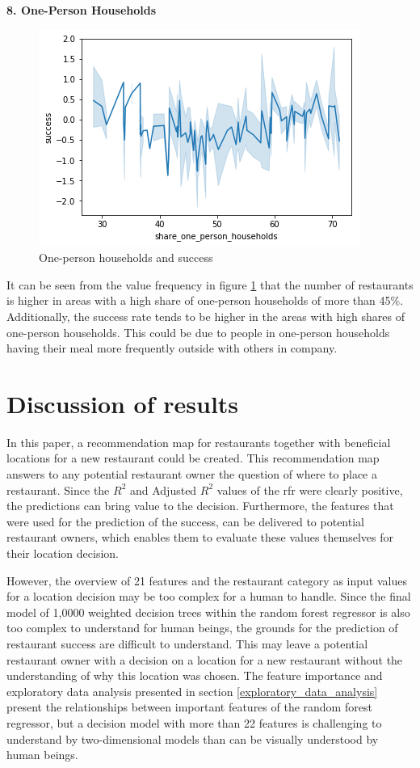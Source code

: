 \documentclass[a4paper, 11pt, oneside]{Thesis}  %
\begin{document}
\textbf{8.	One-Person Households}
 
\begin{figure}[h]
\includegraphics[scale=0.7]{Figures/Exploratory/lineplot_one_person_households.png}
\centering
\caption{One-person households and success}
\label{fig:lineplot_one_person_households}
\end{figure}

It can be seen from the value frequency in figure \ref{fig:lineplot_one_person_households} that the number of restaurants is higher in areas with a high share of one-person households of more than 45\%. Additionally, the success rate tends to be higher in the areas with high shares of one-person households. This could be due to people in one-person households having their meal more frequently outside with others in company.

\section{Discussion of results}
\label{discussion_of_results}

In this paper, a recommendation map for restaurants together with beneficial locations for a new restaurant could be created. This recommendation map answers to any potential restaurant owner the question of where to place a restaurant. Since the $R^2$ and Adjusted $R^2$ values of the \ac{rfr} were clearly positive, the predictions can bring value to the decision. Furthermore, the features that were used for the prediction of the success, can be delivered to potential restaurant owners, which enables them to evaluate these values themselves for their location decision.

However, the overview of 21 features and the restaurant category as input values for a location decision may be too complex for a human to handle. Since the final model of 1,0000 weighted decision trees within the random forest regressor is also too complex to understand for human beings, the grounds for the prediction of restaurant success are difficult to understand. This may leave a potential restaurant owner with a decision on a location for a new restaurant without the understanding of why this location was chosen. The feature importance and exploratory data analysis presented in section \ref{exploratory_data_analysis} present the relationships between important features of the random forest regressor, but a decision model with more than 22 features is challenging to understand by two-dimensional models than can be visually understood by human beings.
\end{document}
